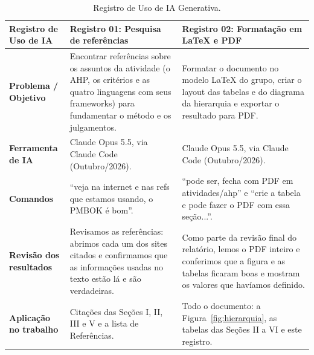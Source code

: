 \documentclass[a4paper]{article}
\begin{document}
\begin{table}[H]
    \centering
    \renewcommand{\arraystretch}{1.5}
    \small
    \begin{tabular}{|>{\raggedright\arraybackslash}p{3cm}|p{6cm}|p{6cm}|}
        \hline
        \rowcolor{eapC}
        \textbf{Registro de Uso de IA} & \textbf{Registro 01: Pesquisa de referências} & \textbf{Registro 02: Formatação em LaTeX e PDF} \\
        \hline
        \textbf{Problema / Objetivo} & Encontrar referências sobre os assuntos da atividade (o AHP, os critérios e as quatro linguagens com seus frameworks) para fundamentar o método e os julgamentos. & Formatar o documento no modelo LaTeX do grupo, criar o layout das tabelas e do diagrama da hierarquia e exportar o resultado para PDF. \\
        \hline
        \textbf{Ferramenta de IA} & Claude Opus 5.5, via Claude Code (Outubro/2026). & Claude Opus 5.5, via Claude Code (Outubro/2026). \\
        \hline
        \textbf{Comandos} & \enquote{veja na internet e nas refs que estamos usando, o PMBOK é bom}. & \enquote{pode ser, fecha com PDF em atividades/ahp} e \enquote{crie a tabela e pode fazer o PDF com essa seção...}. \\
        \hline
        \textbf{Revisão dos resultados} & Revisamos as referências: abrimos cada um dos sites citados e confirmamos que as informações usadas no texto estão lá e são verdadeiras. & Como parte da revisão final do relatório, lemos o PDF inteiro e conferimos que a figura e as tabelas ficaram boas e mostram os valores que havíamos definido. \\
        \hline
        \textbf{Aplicação no trabalho} & Citações das Seções I, II, III e V e a lista de Referências. & Todo o documento: a Figura~\ref{fig:hierarquia}, as tabelas das Seções II a VI e este registro. \\
        \hline
    \end{tabular}
    \caption{Registro de Uso de IA Generativa.}
    \label{tab:uso_ia}
\end{table}
\end{document}
